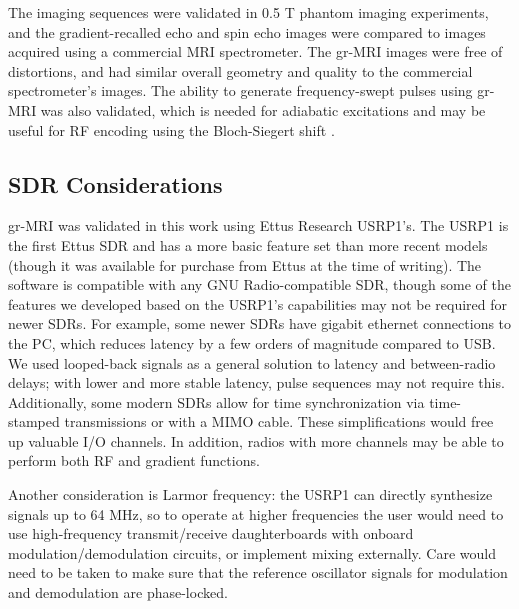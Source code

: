 \documentclass[review]{elsarticle}
\begin{document}
\par The imaging sequences were validated in 0.5 T phantom imaging experiments, 
and the gradient-recalled echo and 
spin echo images were compared to images acquired using a commercial MRI spectrometer.
The gr-MRI images were free of distortions, 
and had similar overall geometry and quality to the commercial spectrometer's images.
The ability to generate frequency-swept pulses using gr-MRI was also validated, 
which is needed for adiabatic excitations \cite{Garwood:2001:J-Magn-Reson:11740891}
and may be useful for RF encoding using the Bloch-Siegert shift \cite{kartausch:13,cao:ismrm14}. 

\subsection{SDR Considerations}
gr-MRI was validated in this work using Ettus Research USRP1's.
The USRP1 is the first Ettus SDR and has a more basic feature set than 
more recent models (though it was available for purchase from Ettus at the time of writing). 
The software is compatible with any GNU Radio-compatible SDR,
though some of the features we developed based on the USRP1's capabilities 
may not be required for newer SDRs.
For example, some newer SDRs have gigabit ethernet connections to the PC,
which reduces latency by a few orders of magnitude compared to USB. 
We used looped-back signals as a general solution to latency and between-radio delays;
with lower and more stable latency, pulse sequences may not require this.
Additionally, some modern SDRs allow for time synchronization via time-stamped transmissions 
or with a MIMO cable.
These simplifications would free up valuable I/O channels.
In addition, 
radios with more channels may be able to perform both RF and gradient functions. 

\par Another consideration is Larmor frequency: 
the USRP1 can directly synthesize signals up to 64 MHz, 
so to operate at higher frequencies the user would need to use high-frequency transmit/receive daughterboards with onboard modulation/demodulation circuits,
or implement mixing externally.
Care would need to be taken to make sure that the reference oscillator signals for modulation
and demodulation are phase-locked.
\end{document}
